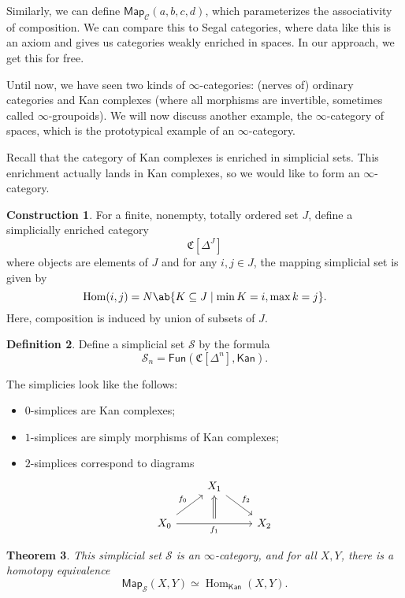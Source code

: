 \documentclass[10pt, oneside]{memoir}
\newtheorem{thm}{Theorem}[subsection]
\theoremstyle{definition}
\newtheorem{defn}[thm]{Definition}
\newtheorem{con}[thm]{Construction}
\theoremstyle{remark}
\theoremstyle{plain}
\theoremstyle{definition}
\theoremstyle{remark}
\newcommand{\mc}[1]{\mathcal{#1}}
\newcommand{\mf}[1]{\mathfrak{#1}}
\newcommand{\ms}[1]{\mathsf{#1}}
\newcommand{\1}{\mathbf{1}}
\newcommand{\2}{\mathbf{2}}
\newcommand{\3}{\mathbf{3}}
\DeclareMathOperator{\Hom}{Hom}
\begin{document}
Similarly, we can define $\ms{Map}_{\mc{C}}(a,b,c,d)$, which parameterizes the associativity of composition. We can compare this to Segal categories, where data like this is an axiom and gives us categories weakly enriched in spaces. In our approach, we get this for free.

Until now, we have seen two kinds of $\infty$-categories: (nerves of) ordinary categories and Kan complexes (where all morphisms are invertible, sometimes called $\infty$-groupoids). We will now discuss another example, the $\infty$-category of spaces, which is the prototypical example of an $\infty$-category.

Recall that the category of Kan complexes is enriched in simplicial sets. This enrichment actually lands in Kan complexes, so we would like to form an $\infty$-category.
\begin{con}
    For a finite, nonempty, totally ordered set $J$, define a simplicially enriched category
    \[ \mf{C}[\Delta^J] \]
    where objects are elements of $J$ and for any $i,j \in J$, the mapping simplicial set is given by
    \[ \Hom(i,j) = N \ab\{K \subseteq J \mid \min K = i, \max k = j\}. \]
    Here, composition is induced by union of subsets of $J$.
\end{con}

\begin{defn}
    Define a simplicial set $\mc{S}$ by the formula
    \[ \mc{S}_n = \ms{Fun}(\mf{C}[\Delta^n], \ms{Kan}). \]
\end{defn}

The simplicies look like the follows:
\begin{itemize}
    \item $0$-simplices are Kan complexes;
    \item $1$-simplices are simply morphisms of Kan complexes;
    \item $2$-simplices correspond to diagrams
    \begin{equation*}
    \begin{tikzcd}
        & |[alias=B]|X_1 \ar{dr}{f_2} & \\
        X_0 \ar{ur}{f_0} \arrow[rr,"f_1"{swap}, ""{name=U}] \arrow[Rightarrow, from=U, to=B] & & X_2
    \end{tikzcd}
    \end{equation*}
\end{itemize}

\begin{thm}
    This simplicial set $\mc{S}$ is an $\infty$-category, and for all $X, Y$, there is a homotopy equivalence
    \[ \ms{Map}_{\mc{S}}(X, Y) \simeq \Hom_{\ms{Kan}}(X, Y). \]
\end{thm}
\end{document}
